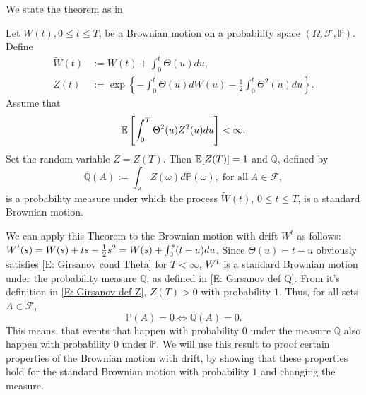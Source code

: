 We state the theorem as in \cite[Theorem 5.2.3]{Shreve2004}
\begin{theorem}[Girsanov] \label{T: Girsanov}
	Let $W(t), 0 \leq t \leq T$, be a Brownian motion on a probability space
	$(\Omega, \mathcal{F}, \mathbb{P})$.
	Define
	\begin{align}
	\tilde{W}(t) &:= W(t) + \int_0^t \Theta(u)du, \label{E: Girsanov def W tilde} \\ 
	Z(t) &:= \exp \left\{ -\int_{0}^{t} \Theta(u) dW(u) - \frac{1}{2} \int_0^t \Theta^2(u)du \right\}. \label{E: Girsanov def Z}
	\end{align}
	Assume that
	\begin{equation} \label{E: Girsanov cond Theta}
	\mathbb{E} \left[  \int_{0}^{T} \Theta^2(u) Z^2(u)du   \right] < \infty.
	\end{equation}
	Set the random variable $Z=Z(T)$. Then $\mathbb{E}[Z(T)] = 1$ and $\mathbb{Q}$, defined by
	\begin{equation} \label{E: Girsanov def Q}
	\mathbb{Q}(A) := \int_A Z(\omega) d\mathbb{P}(\omega), \; \text{for all} \; A \in \mathcal{F},
	\end{equation}
	is a probability measure under which the process 
	$\tilde{W}(t)$, $0 \leq t \leq T$, 
	is a standard Brownian motion.
\end{theorem}

We can apply this Theorem to the Brownian motion with drift $W^t$ as follows:
$W^t(s) = W(s) + ts - \frac{1}{2} s^2 = W(s) + \int_0^s (t-u)du $.
Since $\Theta(u) = t-u$ obviously satisfies \ref{E: Girsanov cond Theta} for $T < \infty$,
$W^t$ is a standard Brownian motion under the probability measure $\mathbb{Q}$, 
as defined in \eqref{E: Girsanov def Q}. 
From it's definition in \eqref{E: Girsanov def Z}, $Z(T) > 0$ with probability $1$.
Thus, for all sets $A \in \mathcal{F}$,
\begin{equation}
\mathbb{P}(A) = 0 \iff \mathbb{Q}(A) = 0.
\end{equation}
This means, that events that happen with probability $0$ under the measure $\mathbb{Q}$ also happen with probability $0$ under $\mathbb{P}$.
We will use this result to proof certain properties of the Brownian motion with drift,
by showing that these properties hold for the standard Brownian motion with probability $1$ and changing the measure.


